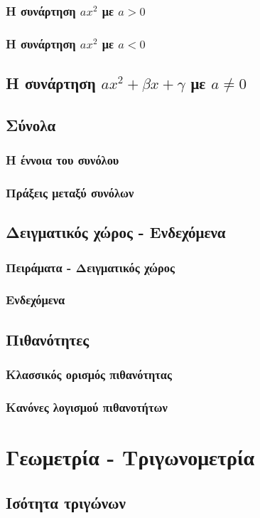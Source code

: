 \documentclass[twoside,10pt]{book}
\begin{document}
\section{Η συνάρτηση {\boldmath$ ax^2 $ με $ a>0$}}
\section{Η συνάρτηση {\boldmath$ ax^2 $ με $ a<0$}}
\chapter{Η συνάρτηση $ ax^2+\beta x+\gamma $ με $ a\neq0 $}
\chapter{Σύνολα}
\section{Η έννοια του συνόλου}
\section{Πράξεις μεταξύ συνόλων}
\chapter{Δειγματικός χώρος - Ενδεχόμενα}
\section{Πειράματα - Δειγματικός χώρος}
\section{Ενδεχόμενα}
\chapter{Πιθανότητες}
\section{Κλασσικός ορισμός πιθανότητας}
\section{Κανόνες λογισμού πιθανοτήτων}
\part{Γεωμετρία - Τριγωνομετρία}
\chapter{Ισότητα τριγώνων}
\end{document}
